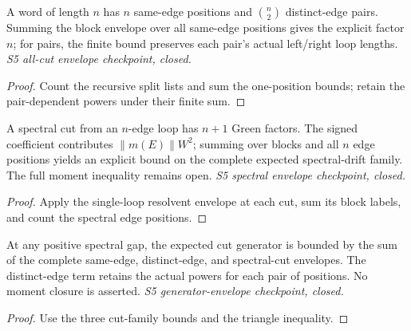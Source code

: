 \begin{lemma}
  \label{lem:loop-hierarchy-cut-total-bound}
  \leanok
  A word of length $n$ has $n$ same-edge positions and
  $\binom n2$ distinct-edge pairs. Summing the block envelope over all
  same-edge positions gives the explicit factor $n$; for pairs, the
  finite bound preserves each pair's actual left/right loop lengths.
  \emph{S5 all-cut envelope checkpoint, closed.}
\end{lemma}
\begin{proof}\leanok
  Count the recursive split lists and sum the one-position bounds;
  retain the pair-dependent powers under their finite sum.
\end{proof}

\begin{lemma}
  \label{lem:loop-hierarchy-spectral-cut-bound}
  \leanok
  A spectral cut from an $n$-edge loop has $n+1$ Green factors.
  The signed coefficient contributes $\|m(E)\|W^2$; summing over
  blocks and all $n$ edge positions yields an explicit bound on the
  complete expected spectral-drift family. The full moment inequality
  remains open. \emph{S5 spectral envelope checkpoint, closed.}
\end{lemma}
\begin{proof}\leanok
  Apply the single-loop resolvent envelope at each cut, sum its block
  labels, and count the spectral edge positions.
\end{proof}

\begin{lemma}
  \label{lem:loop-hierarchy-rhs-bound}
  \leanok
  At any positive spectral gap, the expected cut generator is bounded by
  the sum of the complete same-edge, distinct-edge, and spectral-cut
  envelopes. The distinct-edge term retains the actual powers for each
  pair of positions. No moment closure is asserted.
  \emph{S5 generator-envelope checkpoint, closed.}
\end{lemma}
\begin{proof}\leanok
  Use the three cut-family bounds and the triangle inequality.
\end{proof}


